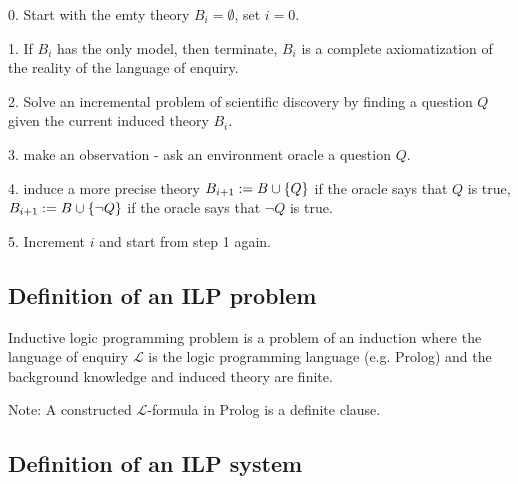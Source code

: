 0. Start with the emty theory $B_i=\emptyset$, set $i=0$.

1. If $B_i$ has the only model, then terminate, $B_i$ is a complete axiomatization of the reality of the language of enquiry.

2. Solve an incremental problem of scientific discovery by finding a question $Q$ given the current induced theory $B_i$.

3. make an observation - ask an environment oracle a question $Q$.

4. induce a more precise theory $B_{i+1}:=B \cup \{Q\}$ if the oracle says that $Q$ is true, $B_{i+1}:=B \cup \{\neg Q\}$ if the oracle says that $\neg Q$ is true.

5. Increment $i$ and start from step 1 again.

\subsection{Definition of an ILP problem}
Inductive logic programming problem is a problem of an induction where the language of enquiry $\mathcal{L}$ is the logic programming language (e.g. Prolog) and the background knowledge and induced theory are finite.

Note: A constructed $\mathcal{L}$-formula in Prolog is a definite clause. 

\subsection{Definition of an ILP system}

